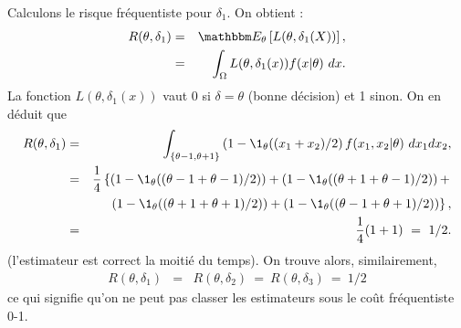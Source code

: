 \begin{rep} %
Calculons le risque fréquentiste pour $\delta_1$. On obtient :
\begin{eqnarray*}
R(\theta,\delta_1) & = & \E_{\theta}\left[L(\theta,\delta_1(X))\right], \\
& = & \int_{\Omega} L(\theta,\delta_1(x)) f(x|\theta) \ dx.
\end{eqnarray*}
La fonction $L(\theta,\delta_1(x))$ vaut 0 si $\delta=\theta$ (bonne décision) et 1 sinon. On en déduit que 
\begin{eqnarray*}
R(\theta,\delta_1) & = & \int_{\{\theta-1,\theta+1\}} \left(1-\1_{\theta}((x_1+x_2)/2\right) f(x_1,x_2|\theta) \ dx_1 d x_2, \\
& = & \frac{1}{4}\left\{\left(1-\1_{\theta}((\theta-1+\theta-1)/2)\right) + \left(1-\1_{\theta}((\theta+1+\theta-1)/2)\right) + \right. \\
& & \ \left. \ \left(1-\1_{\theta}((\theta+1+\theta+1)/2)\right) + \left(1-\1_{\theta}((\theta-1+\theta+1)/2)\right)\right\}, \\
& = & \frac{1}{4}(1+1) \ = \ 1/2.
\end{eqnarray*}
(l'estimateur est correct la moitié du temps). 
On trouve alors, similairement,
\begin{eqnarray*}
R(\theta,\delta_1) & = & R(\theta,\delta_2) \ = \ R(\theta,\delta_3) \ = \ 1/2
\end{eqnarray*}
ce qui signifie qu'on ne peut pas classer les estimateurs sous le coût fréquentiste 0-1.
\end{rep}